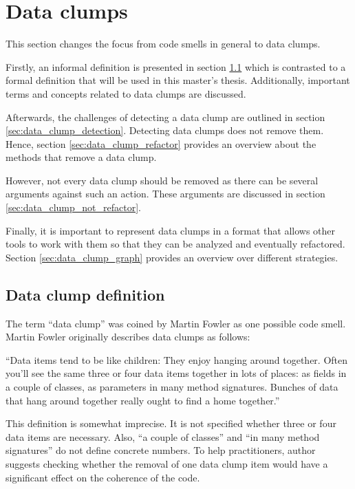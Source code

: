 \section{Data clumps}

This section changes the focus from code smells in general to data clumps. 

Firstly, an informal definition is presented in section \ref{sec:data_clump_def} which is contrasted to a formal definition that will be used in this master's thesis. Additionally, important terms and concepts related to data clumps are discussed. 

Afterwards, the challenges of detecting a data clump are outlined in section \ref{sec:data_clump_detection}. 
Detecting data clumps does not remove them. Hence, section \ref{sec:data_clump_refactor} provides an overview about the methods that remove a data clump. 

However, not every data clump should be removed as there can be several arguments against such an action. These arguments are discussed in section \ref{sec:data_clump_not_refactor}.

Finally, it is important to represent data clumps in a format that allows other tools to work with them so that they can be analyzed and eventually refactored. Section \ref{sec:data_clump_graph} provides an overview over different strategies. 


\subsection{Data clump definition}\label{sec:data_clump_def}
The term \enquote{data clump} was coined by Martin Fowler as one possible code smell. 
Martin Fowler originally describes data clumps as follows:

\begin{displayquote}
\enquote{Data items tend to be like children: They enjoy hanging around together. Often you'll see
the same three or four data items together in lots of
places: as fields in a couple of classes, as parameters in many
method signatures. Bunches of data that hang around together really ought to find a home together.} \cite{fowler2019refactoring} 
\end{displayquote}


This definition is somewhat imprecise. It is not specified whether three or four data items are necessary. Also, \enquote{a couple of classes} and \enquote{in many method signatures} do not define concrete numbers. To help practitioners,   author suggests checking whether the removal of one data clump item would have a significant effect on the coherence of the code.

